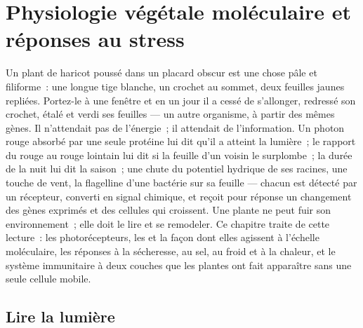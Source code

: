 \chapter{Physiologie végétale moléculaire et réponses au stress}\label{ch:b3:plant-molecular-physiology}

Un plant de haricot poussé dans un placard obscur est une chose pâle et
filiforme~: une longue tige blanche, un crochet au sommet, deux feuilles
jaunes repliées. Portez-le à une fenêtre et en un jour il a cessé de
s'allonger, redressé son crochet, étalé et verdi ses feuilles --- un
autre organisme, à partir des mêmes gènes. Il n'attendait pas de
l'énergie~; il attendait de l'information. Un photon rouge absorbé par
une seule protéine lui dit qu'il a atteint la lumière~; le rapport du
rouge au rouge lointain lui dit si la feuille d'un voisin le surplombe~;
la durée de la nuit lui dit la saison~; une chute du potentiel hydrique
de ses racines, une touche de vent, la flagelline d'une bactérie sur sa
feuille --- chacun est détecté par un récepteur, converti en signal
chimique, et reçoit pour réponse un changement des gènes exprimés et des
cellules qui croissent. Une plante ne peut fuir son environnement~; elle
doit le lire et se remodeler. Ce chapitre traite de cette lecture~: les
photorécepteurs, les  et la façon dont elles agissent à
l'échelle moléculaire, les réponses à la sécheresse, au sel, au froid et
à la chaleur, et le système immunitaire à deux couches que les plantes
ont fait apparaître sans une seule cellule mobile.

\section{Lire la lumière}

